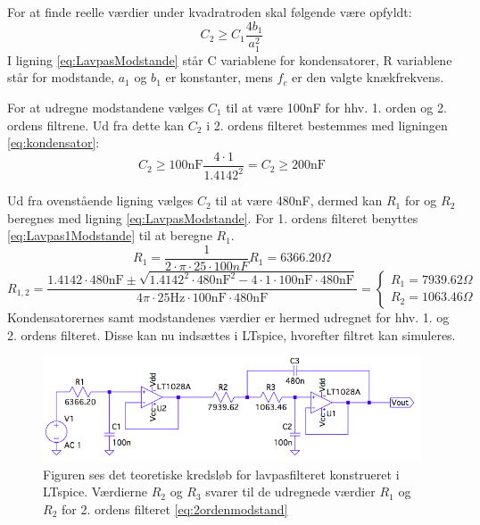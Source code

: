 \noindent  For at finde reelle værdier under kvadratroden skal følgende være opfyldt:
\begin{equation} \label{eq:kondensator}
C_2 \geq C_1 \frac{4b_1}{a_1^2}
\end{equation}
I ligning \ref{eq:LavpasModstande} står C variablene for kondensatorer, R variablene står for modstande, $a_1$ og $b_1$ er konstanter, mens $f_c$ er den valgte knækfrekvens. 

\noindent For at udregne modstandene vælges $C_1$ til at være 100nF for hhv. 1. orden og 2. ordens filtrene. Ud fra dette kan $C_2$ i 2. ordens filteret bestemmes med ligningen \ref{eq:kondensator}:
\begin{equation} 
C_2 \geq 100\text{nF} \frac{4\cdot 1}{1.4142^2} = C_2 \geq 200\text{nF}
\end{equation}

\noindent Ud fra ovenstående ligning vælges $C_2$ til at være 480nF, dermed kan $R_1$ for og $R_2$ beregnes med ligning \ref{eq:LavpasModstande}. For 1. ordens filteret benyttes \ref{eq:Lavpas1Modstande} til at beregne $R_1$.
\begin{equation} 
R_{1} = \frac{1}{2 \cdot \pi \cdot 25 \cdot 100nF} R_{1} = 6366.20 \Omega
\end{equation}
\begin{equation} \label{eq:2ordenmodstand}
R_{1,2} = \frac{1.4142 \cdot 480\text{nF} \pm \sqrt{1.4142^2 \cdot 480\text{nF}^2 - 4 \cdot 1 \cdot 100\text{nF} \cdot 480\text{nF}}}{4 \pi \cdot 25\text{Hz} \cdot 100\text{nF} \cdot 480\text{nF}} = \begin{cases} R_{1} = 7939.62 \Omega \\ R_{2} = 1063.46 \Omega \end{cases}
\end{equation}
\noindent Kondensatorernes samt modstandenes værdier er hermed udregnet for hhv. 1. og 2. ordens filteret. Disse kan nu indsættes i LTspice, hvorefter filtret kan simuleres. 

\begin{figure}[H]
	\centering
	\includegraphics[scale=0.58]{figures/cProblemloesning/Lavpasfilter1_LTspice.PNG}
	\caption{Figuren ses det teoretiske kredsløb for lavpasfilteret konstrueret i LTspice. Værdierne $R_{2}$ og $R_{3}$ svarer til de udregnede værdier $R_{1}$ og $R_{2}$ for 2. ordens filteret \ref{eq:2ordenmodstand}}
	\label{fig:lavpasfilter1_LTspice}
\end{figure}

